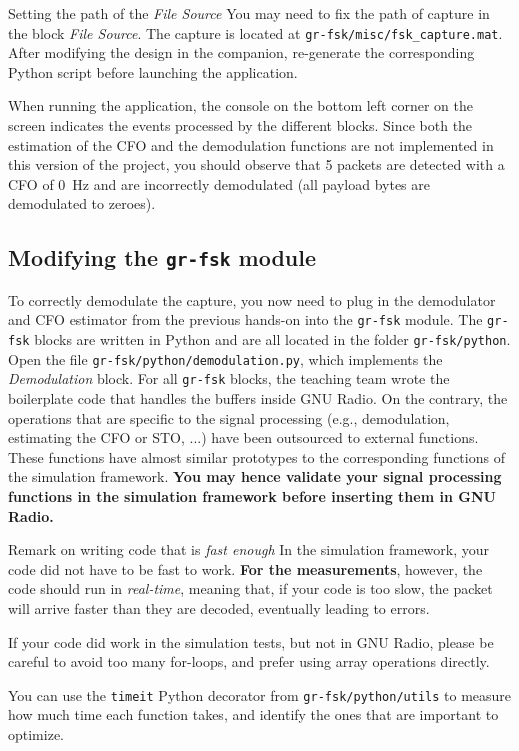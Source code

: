 \begin{bclogo}[couleur = gray!20, arrondi = 0.2, logo=\bcinfo]{Setting the path of the \textit{File Source}}
    You may need to fix the path of capture in the block \textit{File Source}.
    The capture is located at \texttt{gr-fsk/misc/fsk\_capture.mat}.
    After modifying the design in the companion, re-generate the corresponding Python script before launching the application.
\end{bclogo}

When running the application, the console on the bottom left corner on the screen indicates the events processed by the different blocks.
Since both the estimation of the CFO and the demodulation functions are not implemented in this version of the project,
you should observe that 5 packets are detected with a CFO of \SI{0}{\hertz} and are incorrectly demodulated (all payload bytes are demodulated to zeroes).

\subsection{Modifying the \texttt{gr-fsk} module}

To correctly demodulate the capture, you now need to plug in the demodulator and CFO estimator from the previous hands-on into the \texttt{gr-fsk} module.
The \texttt{gr-fsk} blocks are written in Python and are all located in the folder \texttt{gr-fsk/python}.
Open the file \texttt{gr-fsk/python/demodulation.py}, which implements the \textit{Demodulation} block. For all \texttt{gr-fsk} blocks, the teaching team wrote the boilerplate code that
handles the buffers inside GNU Radio. On the contrary, the operations that are specific to the signal processing (e.g., demodulation, estimating the CFO or STO, ...) have been outsourced
to external functions. These functions have almost similar prototypes to the corresponding functions of the simulation framework.
\textbf{You may hence validate your signal processing functions in the simulation framework before inserting them in GNU Radio.}

\begin{bclogo}[couleur = gray!20, arrondi = 0.2, logo=\bcinfo]{Remark on writing code that is \textit{fast enough}}
    In the simulation framework, your code did not have to be fast to work.
    \textbf{For the measurements}, however, the code should run in \textit{real-time},
    meaning that, if your code is too slow, the packet will arrive faster
    than they are decoded, eventually leading to errors.

    If your code did work in the simulation tests, but not in GNU Radio, please
    be careful to avoid too many for-loops, and prefer using array operations
    directly.

    You can use the \texttt{timeit} Python decorator from
    \texttt{gr-fsk/python/utils} to measure how much time each function takes,
    and identify the ones that are important to optimize.
\end{bclogo}

